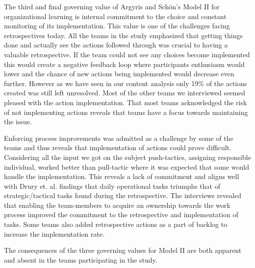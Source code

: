 The third and final governing value of Argyris and Schön's Model II for organizational learning is internal commitment to the choice and constant monitoring of its implementation. This value is one of the challenges facing retrospectives today. All the teams in the study emphasized that getting things done and actually see the actions followed through was crucial to having a valuable retrospective. If the team could not see any choices become implemented this would create a negative feedback loop where participants enthusiasm would lower and the chance of new actions being implemented would decrease even further. However as we have seen in our content analysis only 19\% of the actions created was still left unresolved. Most of the other teams we interviewed seemed pleased with the action implementation. That most teams acknowledged the risk of not implementing actions reveals that teams have a focus towards maintaining the issue. 

Enforcing process improvements was admitted as a challenge by some of the teams and thus reveals that implementation of actions could prove difficult. Considering all the input we got on the subject push-tactics, assigning responsible individual, worked better than pull-tactic where it was expected that some would handle the implementation. This reveals a lack of commitment and aligns well with Drury et. al. \cite{Drury2012} findings that daily operational tasks triumphs that of strategic/tactical tasks found during the retrospective. The interviews revealed that enabling the team-members to acquire an ownership towards the work process improved the commitment to the retrospective and implementation of tasks. Some teams also added retrospective actions as a part of backlog to increase the implementation rate. 

The consequences of the three governing values for Model II are both apparent and absent in the teams participating in the study.

